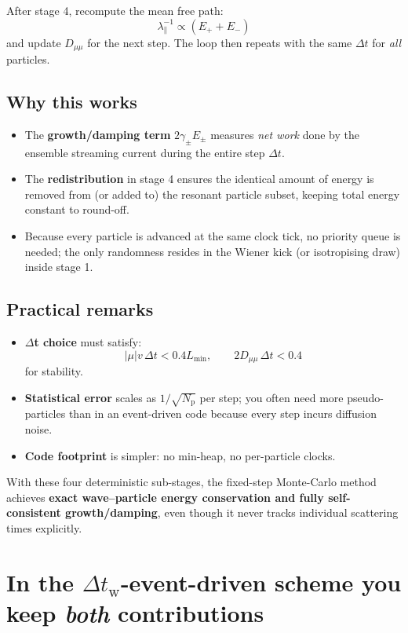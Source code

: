 {After stage 4, recompute the mean free path:
\[
\lambda_{\parallel}^{-1} \propto (E_+ + E_-)
\]
and update $D_{\mu\mu}$ for the next step. The loop then repeats with the same $\Delta t$ for \emph{all} particles.

\subsection*{Why this works}
\begin{itemize}
  \item The \textbf{growth/damping term} $2\gamma_\pm E_\pm$ measures \emph{net work} done by the ensemble streaming current during the entire step $\Delta t$.
  \item The \textbf{redistribution} in stage 4 ensures the identical amount of energy is removed from (or added to) the resonant particle subset, keeping total energy constant to round-off.
  \item Because every particle is advanced at the same clock tick, no priority queue is needed; the only randomness resides in the Wiener kick (or isotropising draw) inside stage 1.
\end{itemize}

\subsection*{Practical remarks}
\begin{itemize}
  \item \textbf{$\Delta$t choice} must satisfy:
  \[
  |\mu|v\,\Delta t < 0.4L_{\min},\qquad 2D_{\mu\mu}\,\Delta t < 0.4
  \]
  for stability.
  \item \textbf{Statistical error} scales as $1/\sqrt{N_{\mathrm{p}}}$ per step; you often need more pseudo-particles than in an event-driven code because every step incurs diffusion noise.
  \item \textbf{Code footprint} is simpler: no min-heap, no per-particle clocks.
\end{itemize}

\bigskip

With these four deterministic sub-stages, the fixed-step Monte-Carlo method achieves \textbf{exact wave–particle energy conservation and fully self-consistent growth/damping}, even though it never tracks individual scattering times explicitly.

\section*{In the \texorpdfstring{$\Delta t_{\mathrm w}$}{Δt\_w}-event-driven scheme you keep \emph{both} contributions}

}
